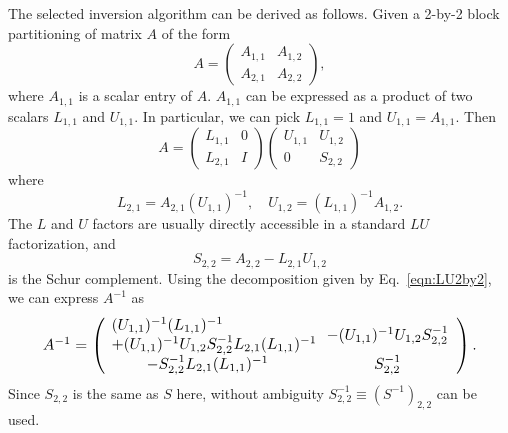 \documentclass{acm_proc_article-sp}
\begin{document}
The selected inversion algorithm can be derived as follows. 
Given a 2-by-2 block partitioning of matrix $A$ of the form
\begin{equation}
	A = \begin{pmatrix}
		A_{1,1} & A_{1,2}\\
		A_{2,1} & A_{2,2}
	\end{pmatrix},
	\label{}
\end{equation}
where $A_{1,1}$ is a scalar entry of $A$. 
$A_{1,1}$ can be expressed as a product of two scalars $L_{1,1}$ and $U_{1,1}$.
In particular, we can pick $L_{1,1}=1$ and $U_{1,1}=A_{1,1}$. Then 
\begin{equation}
	A = \begin{pmatrix}
		L_{1,1} & 0\\
		L_{2,1} & I 
	\end{pmatrix}
	\begin{pmatrix}
		U_{1,1} & U_{1,2}\\
		0      & S_{2,2}
	\end{pmatrix}
	\label{eqn:LU2by2}
\end{equation}
where
\begin{equation}
	L_{2,1}=A_{2,1} (U_{1,1})^{-1}, \quad U_{1,2} = (L_{1,1})^{-1}	A_{1,2}.
	\label{}
\end{equation}
The $L$ and $U$ factors are usually directly accessible in a standard
$LU$ factorization, and
\begin{equation}
	S_{2,2} = A_{2,2} - L_{2,1} U_{1,2}	
	\label{}
\end{equation}
is the Schur complement.  Using the decomposition given by 
Eq.~\eqref{eqn:LU2by2}, we can express $A^{-1}$ as
\begin{equation}
\resizebox{.9\linewidth}{!}{$
	A^{-1} = \left(\hspace{-2mm}\begin{array}{cc}
		 \begin{array}{l}
        (U_{1,1})^{-1} (L_{1,1})^{-1} \\
+ (U_{1,1})^{-1} U_{1,2} S^{-1}_{2,2} L_{2,1} (L_{1,1})^{-1} \hspace{-3mm}
 \end{array} & - (U_{1,1})^{-1} U_{1,2} S^{-1}_{2,2}\\
		-S^{-1}_{2,2} L_{2,1} (L_{1,1})^{-1} & S_{2,2}^{-1}
	\end{array}\right)
.
$}
	\label{eqn:Ainv2by2}
\end{equation}
Since $S_{2,2}$ is the same as $S$ here, without
ambiguity $S_{2,2}^{-1}\equiv (S^{-1})_{2,2}$ can be used.
\end{document}

